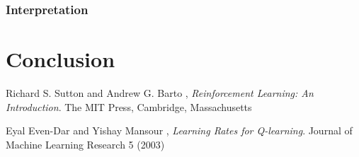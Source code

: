 \documentclass[11pt]{article}
\begin{document}
\subsubsection{Interpretation}


\subsubsection{}

\section{Conclusion}

\begin{thebibliography}{9}

  Richard S. Sutton and Andrew G. Barto ,
  \emph{Reinforcement Learning: An Introduction}.
  The MIT Press, Cambridge, Massachusetts

  Eyal Even-Dar and Yishay Mansour ,
  \emph{Learning Rates for Q-learning}.
  Journal of Machine Learning Research 5 (2003)

\end{thebibliography}
\end{document}
